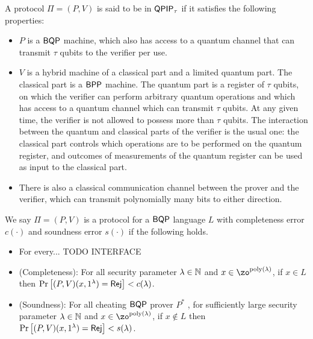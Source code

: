 \begin{definition}
	A protocol $\Pi=(P, V)$ is said to be in $\operatorname{\mathsf{QPIP}}_\tau$ if it satisfies the following properties:
	\begin{itemize}
		\item $P$ is a $\operatorname{\mathsf{BQP}}$  machine, which also has access to a quantum channel that can transmit $\tau$ qubits to the verifier per use.
		\item $V$ is a hybrid machine of a classical part and a limited quantum part. The classical part is a $\operatorname{\mathsf{BPP}}$ machine. The quantum part is a register of $\tau$ qubits, on which the verifier can perform arbitrary quantum operations and which has access to a quantum channel which can transmit $\tau$ qubits. At any given time, the verifier is not allowed to possess more than $\tau$ qubits. The interaction between the quantum and classical parts of the verifier is the usual one: the classical part controls which operations are to be performed on the quantum register, and outcomes of measurements of the quantum register can be used as input to the classical part.
		\item There is also a classical communication channel between the prover and the verifier, which can transmit polynomially many bits to either direction.
	\end{itemize}
\end{definition}


\begin{definition} 
	We say  $\Pi=(P, V)$ is a protocol for a $\operatorname{\mathsf{BQP}}$ language $L$ with completeness error $c(\cdot)$ and soundness error $s(\cdot)$ if the following holds.
\begin{itemize}
	    \item For every... TODO INTERFACE
		\item (Completeness): For all security parameter $\lambda\in\mathbb{N}$ and $x\in\zo^{\poly(\lambda)}$, if $x\in L$ then
		$\Pr\left[(P, V)(x, 1^\lambda)=\mathsf{Rej}\right]<c(\lambda)$.
		\item (Soundness): For all cheating $\operatorname{\mathsf{BQP}}$ prover $P^*$ , for sufficiently large security parameter $\lambda\in\mathbb{N}$ and $x\in\zo^{\poly(\lambda)}$, if $x \notin L$ then $\Pr\left[(P, V)(x, 1^\lambda)=\mathsf{Rej}\right]<s(\lambda)$.
	\end{itemize}
\end{definition}

